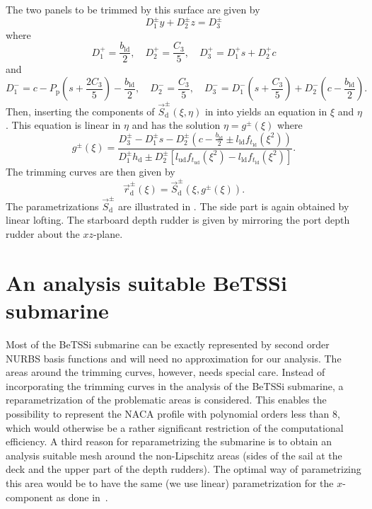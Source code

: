 The two panels to be trimmed by this surface are given by
\begin{equation}\label{Eq3:panels}
	D_1^\pm y + D_2^\pm z = D_3^\pm
\end{equation}
where
\begin{equation*}
	D_1^+ = \frac{b_{\mathrm{ld}}}{2},\quad D_2^+ = \frac{C_3}{5},\quad  D_3^+ =  D_1^+s+D_2^+c
\end{equation*}
and
\begin{equation*}
	D_1^- = c-P_{\mathrm{p}}\left(s+\frac{2C_3}{5}\right)-\frac{b_{\mathrm{ld}}}{2},\quad D_2^- = \frac{C_3}{5},\quad  D_3^- =  D_1^-\left(s+\frac{C_3}{5}\right)+D_2^-\left(c-\frac{b_{\mathrm{ld}}}{2}\right).
\end{equation*}
Then, inserting the components of $\vec{S}_{\mathrm{d}}^\pm(\xi,\eta)$ in  into  yields an equation in $\xi$ and $\eta$. This equation is linear in $\eta$ and has the solution $\eta=g^\pm(\xi)$ where
\begin{equation*}
	g^\pm(\xi) = \frac{D_3^\pm - D_1^\pm s - D_2^\pm\left(c-\frac{b_{\mathrm{ld}}}{2}\pm l_{\mathrm{ld}}f_{t_{\mathrm{ld}}}(\xi^2)\right)}{D_1^\pm h_{\mathrm{d}}\pm D_2^\pm\left[l_{\mathrm{ud}}f_{t_{\mathrm{ud}}}(\xi^2) - l_{\mathrm{ld}}f_{t_{\mathrm{ld}}}(\xi^2)\right]}.
\end{equation*}
The trimming curves are then given by
\begin{equation*}
	\vec{r}_{\mathrm{d}}^\pm(\xi) = \vec{S}_{\mathrm{d}}^\pm(\xi,g^\pm(\xi)).
\end{equation*}
The parametrizations $\vec{S}_{\mathrm{d}}^\pm$ are illustrated in . The side part is again obtained by linear lofting. The starboard depth rudder is given by mirroring the port depth rudder about the $xz$-plane.

\section{An analysis suitable BeTSSi submarine}
\label{Sec3:BeTSSi_approximation}
Most of the BeTSSi submarine can be exactly represented by second order NURBS basis functions and will need no approximation for our analysis. The areas around the trimming curves, however, needs special care. Instead of incorporating the trimming curves in the analysis of the BeTSSi submarine, a reparametrization of the problematic areas is considered. This enables the possibility to represent the NACA profile with polynomial orders less than 8, which would otherwise be a rather significant restriction of the computational efficiency. A third reason for reparametrizing the submarine is to obtain an analysis suitable mesh around the non-Lipschitz areas (sides of the sail at the deck and the upper part of the depth rudders). The optimal way of parametrizing this area would be to have the same (we use linear) parametrization for the $x$-component as done in~\cite{Lipton2010roi}.

